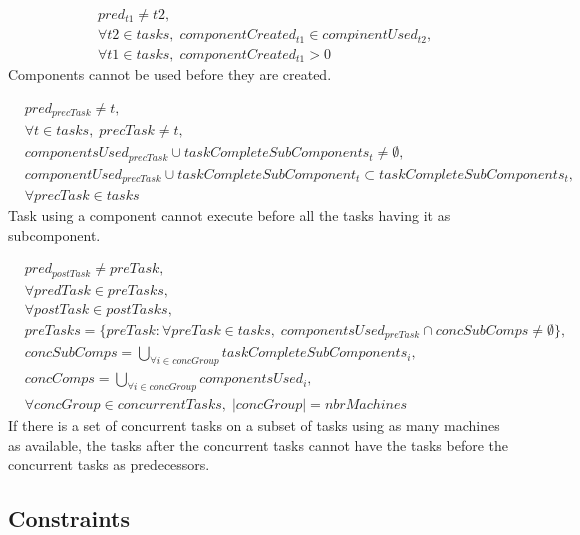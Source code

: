\documentclass[10pt,a4paper]{report}
\begin{document}
\begin{equation}
\begin{aligned}\label{eq:89}
&pred_{t1} \neq t2, \\
&\forall t2 \in tasks, \; componentCreated_{t1} \in compinentUsed_{t2}, \\
&\forall t1 \in tasks, \; componentCreated_{t1} > 0
\end{aligned}
\end{equation}
Components cannot be used before they are created.

\begin{equation}
\begin{aligned}\label{eq:90}
&pred_{precTask} \neq t, \\
&\forall t \in tasks, \; precTask \neq t, \\
&componentsUsed_{precTask} \cup taskCompleteSubComponents_t \neq \emptyset, \\
&componentUsed_{precTask} \cup taskCompleteSubComponent_t \subset taskCompleteSubComponents_t, \\
&\forall precTask \in tasks
\end{aligned}
\end{equation}
Task using a component cannot execute before all the tasks having it as subcomponent.

\begin{equation}
\begin{aligned}\label{eq:91}
&pred_{postTask} \neq preTask, \\
&\forall predTask \in preTasks, \\
&\forall postTask \in postTasks, \\
&preTasks = \{preTask : \forall preTask \in tasks, \; componentsUsed_{preTask} \cap concSubComps \neq \emptyset\}, \\
&concSubComps = \bigcup_{\forall i \in concGroup}taskCompleteSubComponents_i, \\
&concComps = \bigcup_{\forall i \in concGroup}componentsUsed_i, \\
&\forall concGroup \in concurrentTasks, \; |concGroup| = nbrMachines
\end{aligned}
\end{equation}
If there is a set of concurrent tasks on a subset of tasks using as many machines as available, the tasks after the concurrent tasks cannot have the tasks before the concurrent tasks as predecessors.


\subsection*{Constraints}
\end{document}
